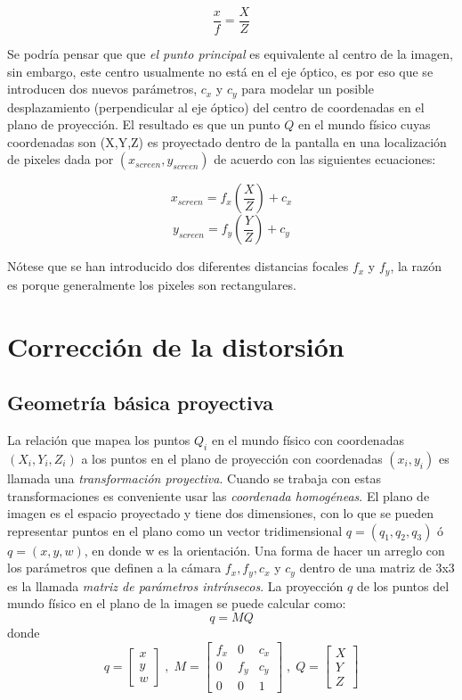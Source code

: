 \[\frac{x}{f} = \frac{X}{Z}\]

Se podría pensar que que \textit{el punto principal} es equivalente al centro de la imagen, sin embargo, este centro usualmente no está en el eje óptico, es por eso que se introducen dos nuevos parámetros, $c_{x}$ y $c_{y}$ para modelar un posible desplazamiento (perpendicular al eje óptico) del centro de coordenadas en el plano de proyección. El resultado es que un punto $Q$ en el mundo físico cuyas coordenadas son  (X,Y,Z) es proyectado dentro de la pantalla en una localización de pixeles dada por $(x_{screen},y_{screen})$ de acuerdo con las siguientes ecuaciones:

\[x_{screen}=f_{x}\left(\frac{X}{Z}\right ) + c_{x}\]	
\[y_{screen}=f_{y}\left(\frac{Y}{Z}\right ) + c_{y}\]

Nótese que se han introducido dos diferentes distancias focales $f_{x}$ y $f_{y}$, la razón es porque generalmente los pixeles son rectangulares.
		
	\section{Corrección de la distorsión}
		\subsection*{Geometría básica proyectiva}
La relación que mapea los puntos $Q_{i}$ en el mundo físico con coordenadas $(X_{i},Y_{i},Z_{i})$ a los puntos en el plano de proyección con coordenadas $(x_{i},y_{i})$ es llamada una \textit{transformación proyectiva}. Cuando se trabaja con estas transformaciones es conveniente usar las \textit{coordenada homogéneas}. El plano de imagen es el espacio proyectado y tiene dos dimensiones, con lo que se pueden representar puntos en el plano como un vector tridimensional $q=(q_{1},q_{2},q_{3})$ ó $q=(x, y, w)$, en donde w es la orientación. Una forma de hacer un arreglo con los parámetros que definen a la cámara $f_{x},f_{y},c_{x}$ y $c_{y}$ dentro de una matriz de 3x3 es la llamada \textit{matriz de parámetros intrínsecos}. La proyección $q$ de los puntos del mundo físico en el plano de la imagen se puede calcular como: 
\[q=MQ\]
donde
\[q=
\begin{bmatrix}
x\\ 
y\\
w 
\end{bmatrix}\;,\;M=
\begin{bmatrix}
f_{x} & 0 & c_{x}\\ 
0     &f_{y}&c_{y} \\
0     & 0 & 1
\end{bmatrix}\;,\;Q=
\begin{bmatrix}
X\\
Y\\
Z
\end{bmatrix}
\]
